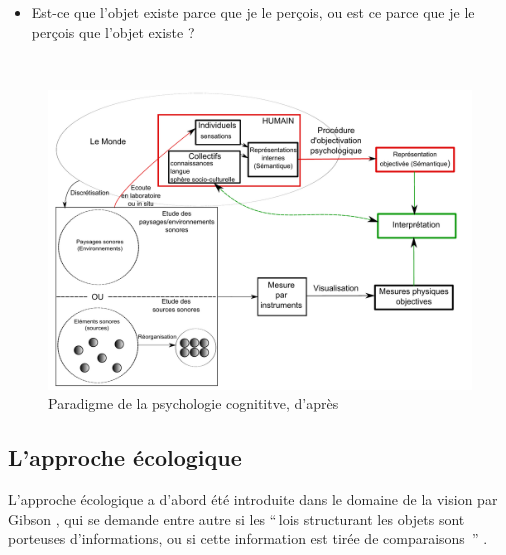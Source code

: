 \begin{itemize}
\item Est-ce que l'objet existe parce que je le perçois, ou est ce parce que je le perçois que l'objet existe ?
\end{itemize}

\\


\begin{figure}[t]
        \myfloatalign
        \includegraphics[width=\linewidth]{gfx/Shema_maffiolo}
        \caption[Paradigme de la psychologie cognititve]{Paradigme de la psychologie cognititve, d'après \citep{maffiolo_caracterisation_1999} }\label{fig:paradigmePsychoCo}
\end{figure}

\subsection{L'approche écologique}
\label{sec:ch3_ecologique}

L'approche écologique a d'abord été introduite dans le domaine de la vision par Gibson \citep{gibson1966senses}, qui se demande entre autre si les ``\,lois structurant les objets sont porteuses d'informations, ou si cette information est tirée de comparaisons \,'' \citep{gibson1978ecological}.


